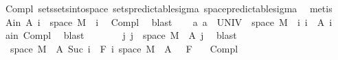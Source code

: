 \begin{isabellebody}
\ Compl{\isacharparenleft}{\kern0pt}{}{\isacharparenright}{\kern0pt}\ sets{\isachardot}{\kern0pt}sets{\isacharunderscore}{\kern0pt}into{\isacharunderscore}{\kern0pt}space\ sets{\isacharunderscore}{\kern0pt}predictable{\isacharunderscore}{\kern0pt}sigma\ space{\isacharunderscore}{\kern0pt}predictable{\isacharunderscore}{\kern0pt}sigma\ \isamarkupfalse%
\ metis\isanewline
\ \ \isamarkupfalse%
\ A{\isacharunderscore}{\kern0pt}in{\isacharcolon}{\kern0pt}\ {\isachardoublequoteopen}A\ i\ {\isasymsubseteq}\ space\ M{\isachardoublequoteclose}\ \ i\ \isamarkupfalse%
\ Compl{\isacharparenleft}{\kern0pt}{}{\isacharparenright}{\kern0pt}\ \isamarkupfalse%
\ blast\isanewline
\ \ \isamarkupfalse%
\ a{\isacharcolon}{\kern0pt}\ {\isachardoublequoteopen}a\ {\isacharequal}{\kern0pt}\ UNIV\ {\isasymtimes}\ space\ M\ {\isacharminus}{\kern0pt}\ {\isacharparenleft}{\kern0pt}{\isasymUnion}i{\isachardot}{\kern0pt}\ {\isacharbraceleft}{\kern0pt}i{\isacharbraceright}{\kern0pt}\ {\isasymtimes}\ A\ i{\isacharparenright}{\kern0pt}{\isachardoublequoteclose}\ \isamarkupfalse%
\ a{\isacharunderscore}{\kern0pt}in\ Compl{\isacharparenleft}{\kern0pt}{}{\isacharparenright}{\kern0pt}\ \isamarkupfalse%
\ blast\isanewline
\ \ \isamarkupfalse%
\ \isamarkupfalse%
\ {\isachardoublequoteopen}{\isachardot}{\kern0pt}{\isachardot}{\kern0pt}{\isachardot}{\kern0pt}\ {\isacharequal}{\kern0pt}\ {\isacharparenleft}{\kern0pt}{\isasymUnion}j{\isachardot}{\kern0pt}\ {\isacharbraceleft}{\kern0pt}j{\isacharbraceright}{\kern0pt}\ {\isasymtimes}\ {\isacharparenleft}{\kern0pt}space\ M\ {\isacharminus}{\kern0pt}\ A\ j{\isacharparenright}{\kern0pt}{\isacharparenright}{\kern0pt}{\isachardoublequoteclose}\ \isamarkupfalse%
\ blast\isanewline
\ \ \isamarkupfalse%
\ \isamarkupfalse%
\ {\isacharasterisk}{\kern0pt}{\isacharcolon}{\kern0pt}\ {\isachardoublequoteopen}{\isacharparenleft}{\kern0pt}space\ M\ {\isacharminus}{\kern0pt}\ A\ {\isacharparenleft}{\kern0pt}Suc\ i{\isacharparenright}{\kern0pt}{\isacharparenright}{\kern0pt}\ {\isasymin}\ F\ i{\isachardoublequoteclose}\ {\isachardoublequoteopen}{\isacharparenleft}{\kern0pt}space\ M\ {\isacharminus}{\kern0pt}\ A\ {}{\isacharparenright}{\kern0pt}\ {\isasymin}\ F\ {}{\isachardoublequoteclose}\ \isamarkupfalse%
\ Compl{\isacharparenleft}{\kern0pt}{}{\isacharcomma}{\kern0pt}{}{\isacharparenright}{\kern0pt}\ \isamarkupfalse%

\end{isabellebody}
